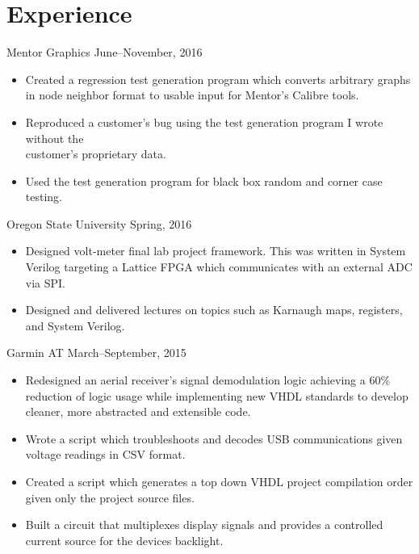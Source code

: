 \documentclass[]{friggeri-cv}
\begin{document}
\section{Experience}

         {Mentor Graphics}
         {June--November, 2016}
         \begin{itemize}
           \item Created a regression test generation program which converts arbitrary 
                 graphs in node neighbor format to usable input for Mentor's Calibre tools.
           \item Reproduced a customer's bug using the test generation program I wrote
                 without the \\ customer's proprietary data.
           \item Used the test generation program for black box random and corner case testing.
        \end{itemize}

         {Oregon State University}
         {Spring, 2016}
         \begin{itemize}
           \item Designed volt-meter final lab project framework. This was written in 
                 System Verilog targeting a Lattice FPGA which communicates with an 
                 external ADC via SPI.
           \item Designed and delivered lectures on topics such as Karnaugh maps, registers,
                 and System Verilog.
         \end{itemize}

         {Garmin AT}
         {March--September, 2015}
         \begin{itemize}
           \item Redesigned an aerial receiver's signal demodulation logic achieving a 
                 $60\%$ reduction of logic usage while implementing new VHDL 
                 standards to develop cleaner, more abstracted and extensible code.
           \item Wrote a script which troubleshoots and decodes USB communications given 
                 voltage readings in CSV format.
           \item Created a script which generates a top down VHDL project compilation order 
                 given only the project source files.
           \item Built a circuit that multiplexes display signals and provides
                 a controlled current source for the devices backlight.
         \end{itemize}
\end{document}
